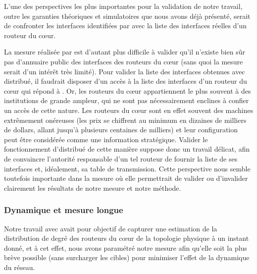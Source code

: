 L'une des perspectives les plus importantes pour la validation de notre travail,
outre les garanties théoriques et simulatoires que nous avons déjà présenté,
serait de confronter les interfaces identifiées par \udpping avec la liste des
interfaces réelles d'un routeur du c\oe{}ur.

La mesure réalisée par \udpping est d'autant plus difficile à valider qu'il
n'existe bien sûr pas d'annuaire public des interfaces des routeurs du c\oe{}ur
(sans quoi la mesure serait d'un intérêt très limité). Pour valider la liste des
interfaces obtenues avec \udpping distribué, il faudrait disposer d'un accès à
la liste des interfaces d'un routeur du c\oe{}ur qui répond à \udpping. Or, les
routeurs du c\oe{}ur appartiennent le plus souvent à des institutions de grande
ampleur, qui ne sont pas nécessairement enclines à confier un accès de cette
nature.
Les routeurs du c\oe{}ur sont en effet souvent des machines extrêmement onéreuses
(les prix se chiffrent au minimum en dizaines de milliers de dollars, allant
jusqu'à plusieurs centaines de milliers) et leur configuration peut être
considérée comme une information stratégique. Valider le fonctionnement
d'\udpping distribué de cette manière suppose donc un travail délicat, afin
de convaincre l'autorité responsable d'un tel routeur de fournir la liste de ses
interfaces et, idéalement, sa table de transmission. Cette perspective nous
semble toutefois importante dans la mesure où elle permettrait de valider ou
d'invalider clairement les résultats de notre mesure et notre méthode.

\subsubsection{Dynamique et mesure longue}

Notre travail avec \udpping avait pour objectif de capturer une estimation de la
distribution de degré des routeurs du c\oe{}ur de la topologie physique à un
instant donné, et à cet effet, nous avons paramétré notre mesure afin qu'elle
soit la plus brève possible (sans surcharger les cibles) pour minimiser l'effet
de la dynamique du réseau.

